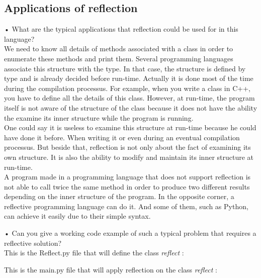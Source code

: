 \subsection{Applications of reflection}
•	What are the typical applications that reflection could be used for in this language?\\

We need to know all details of methods associated with a class in order to enumerate these methods and print them. Several programming languages associate this structure with the type. In that case, the structure is defined by type and is already decided before run-time. Actually it is done most of the time during the compilation processus. For example, when you write a class in C++, you have to define all the details of this class. However, at run-time, the program itself is not aware of the structure of the class because it does not have the ability the examine its inner structure while the program is running.\\
One could say it is useless to examine this structure at run-time because he could have done it before. When writing it or even during an eventual compilation processus. But beside that, reflection is not only about the fact of examining its own structure. It is also the ability to modify and maintain its inner structure at run-time.\\
A program made in a programming language that does not support reflection is not able to call twice the same method in order to produce two different results depending on the inner structure of the program. In the opposite corner, a reflective programming language can do it. And some of them, such as Python, can achieve it easily due to their simple syntax. \cite{assembleforce}
\newline


•	Can you give a working code example of such a typical problem that requires a reflective solution?\\

This is the Reflect.py file that will define the class \emph{reflect} :


This is the main.py file that will apply reflection on the class \emph{reflect} :


